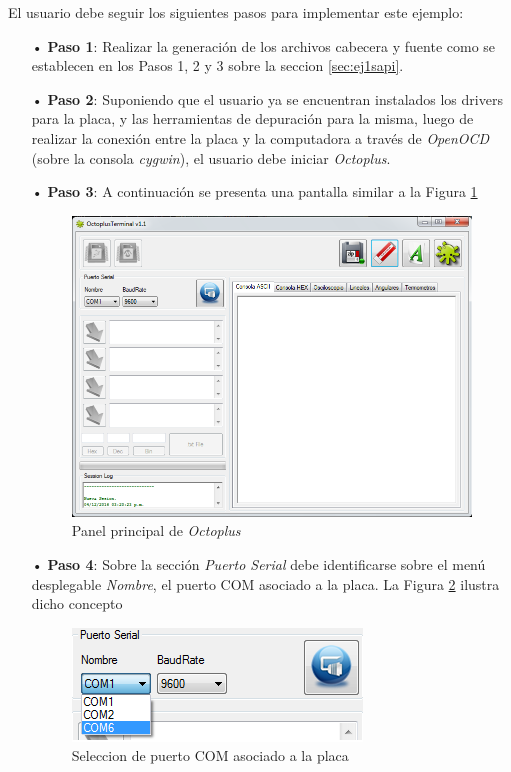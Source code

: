 \documentclass[12pt,letterpaper]{article}
\begin{document}
El usuario debe seguir los siguientes pasos para implementar este ejemplo:
\begin{enumerate}
\item[•]\textbf{Paso 1}: Realizar la generación de los archivos cabecera y fuente como se establecen en los Pasos 1, 2 y 3 sobre la seccion \ref{sec:ej1sapi}.
\item[•]\textbf{Paso 2}: Suponiendo que el usuario ya se encuentran instalados los drivers para la placa, y las herramientas de depuración para la misma, luego de realizar la conexión entre la placa y la computadora a través de \textit{OpenOCD} (sobre la consola \textit{cygwin}), el usuario debe iniciar \textit{Octoplus}.
\item[•]\textbf{Paso 3}: A continuación se presenta una pantalla similar a la Figura \ref{Fig29}


\begin{figure}[H]
\centering
\includegraphics[width=6 cm]{figuras/f11.png}
\caption{Panel principal de \textit{Octoplus}}
\label{Fig29}
\end{figure}


\item[•]\textbf{Paso 4}: Sobre la sección \textit{Puerto Serial} debe identificarse sobre el menú desplegable \textit{Nombre}, el puerto COM asociado a la placa. La Figura \ref{Fig30} ilustra dicho concepto


\begin{figure}[!h]
\centering
\includegraphics[width=4 cm]{figuras/f12.png}
\caption{Seleccion de puerto COM asociado a la placa}
\label{Fig30}
\end{figure}


\end{enumerate}
\end{document}
